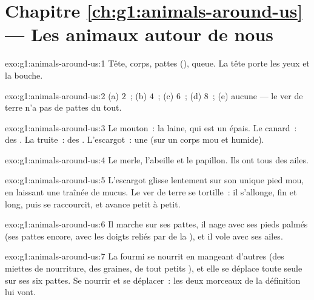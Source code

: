 \section*{Chapitre \ref{ch:g1:animals-around-us} --- Les animaux autour de nous}

\begin{solution}{exo:g1:animals-around-us:1}
Tête, corps, pattes (), queue. La tête porte les yeux et la
bouche.
\end{solution}

\begin{solution}{exo:g1:animals-around-us:2}
(a) $2$~; (b) $4$~; (c) $6$~; (d) $8$~; (e) aucune --- le ver de
terre n'a pas de pattes du tout.
\end{solution}

\begin{solution}{exo:g1:animals-around-us:3}
Le mouton~: la laine, qui est un  épais. Le canard~: des
. La truite~: des . L'escargot~: une  (sur un
corps mou et humide).
\end{solution}

\begin{solution}{exo:g1:animals-around-us:4}
Le merle, l'abeille et le papillon. Ils ont tous des ailes.
\end{solution}

\begin{solution}{exo:g1:animals-around-us:5}
L'escargot glisse lentement sur son unique pied mou, en laissant une
traînée de mucus. Le ver de terre se tortille~: il s'allonge, fin et
long, puis se raccourcit, et avance petit à petit.
\end{solution}

\begin{solution}{exo:g1:animals-around-us:6}
Il marche sur ses pattes, il nage avec ses pieds palmés (ses pattes
encore, avec les doigts reliés par de la ), et il vole avec ses
ailes.
\end{solution}

\begin{solution}{exo:g1:animals-around-us:7}
La fourmi se nourrit en mangeant d'autres  (des miettes
de nourriture, des graines, de tout petits ), et elle se
déplace toute seule sur ses six pattes. Se nourrir et se déplacer~:
les deux morceaux de la définition lui vont.
\end{solution}

